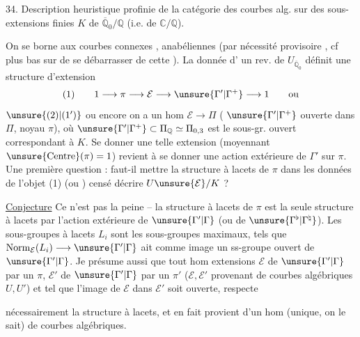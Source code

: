 
34. Description heuristique profinie de la catégorie
des courbes alg.  sur  des sous-
extensions finies $K$ de $\overline{\mathbb Q}_0/\mathbb Q$ (i.e. de $\mathbb C/\mathbb Q$).

On se borne aux courbes  connexes , anabéliennes
(par nécessité provisoire \unsure{!}, cf plus bas sur  de
se débarrasser de cette ). La donnée d'
un rev.  de  $U_{\overline{\mathbb Q}_0}$ définit une
structure d'extension
\[
(1)\qquad 1\longrightarrow\pi\longrightarrow\mathcal E\longrightarrow\unsure{\Gamma'|\Gamma^{+}}\longrightarrow1\qquad\text{ou}
\]
$\unsure{(2)|(1')}$ ou encore on a un hom $\mathcal E\longrightarrow\Pi$
( $\unsure{\Gamma'|\Gamma^{+}}$ ouverte dans $\Pi$,
noyau  $\pi$),
où $\unsure{\Gamma'|\Gamma^{+}}\subset\Pi_{\mathbb Q}\simeq\Pi_{0,3}$ est le sous-gr. ouvert
correspondant à $K$. Se donner une telle
extension (moyennant $\unsure{\mathrm{Centre}}(\pi)=1$) revient à
se donner une action extérieure de $\Gamma'$ sur $\pi$.
Une première question : faut-il mettre la
structure à lacets de $\pi$ dans les  données  de
l'objet (1) (ou ) censé décrire $U\unsure{\mathcal E}/K$ ?

\uline{Conjecture} Ce n'est pas la peine -- la structure à lacets
de $\pi$ est la seule structure à lacets 
par l'action extérieure de $\unsure{\Gamma'|\Gamma}$ (ou de $\unsure{\Gamma^{\flat}|\Gamma^{\natural}}$). Les
sous-groupes à lacets $L_i$ sont les sous-groupes
maximaux, tels que $\mathrm{Norm}_{\mathcal E}(L_i)\longrightarrow\unsure{\Gamma'|\Gamma}$ ait
comme image un ss-groupe ouvert de $\unsure{\Gamma'|\Gamma}$.
Je
présume aussi que tout hom  extensions
$\mathcal E$ de $\unsure{\Gamma'|\Gamma}$ par un $\pi$, $\mathcal E'$ de $\unsure{\Gamma'|\Gamma}$ par un $\pi'$
($\mathcal E,\mathcal E'$ provenant de courbes algébriques $U,U'$) et tel
que l'image de $\mathcal E$ dans $\mathcal E'$ soit ouverte, respecte

nécessairement la structure à lacets, et en fait
provient d'un hom (unique, on le sait) de courbes
algébriques.

